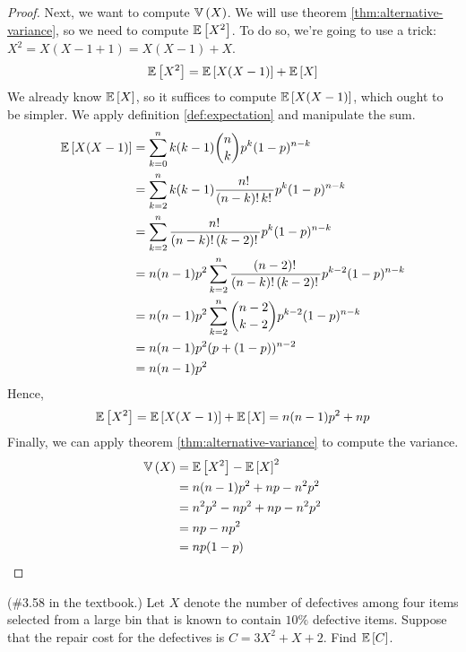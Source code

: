 \documentclass[11pt]{article}
\begin{document}
\begin{proof}
    Next, we want to compute $\operatorname{\mathbb{V}}{\left(X\right)}$.
    We will use theorem \ref{thm:alternative-variance}, so we need to compute
    $\operatorname{\mathbb{E}}{\left[X^2\right]}$.
    To do so, we're going to use a trick: $X^2 = X(X - 1 + 1) = X(X-1) + X$.
    \begin{equation*}
        \operatorname{\mathbb{E}}{\left[X^2\right]} = \operatorname{\mathbb{E}}{\left[X(X-1)\right]} + \operatorname{\mathbb{E}}{\left[X\right]}
    \end{equation*}
    We already know $\operatorname{\mathbb{E}}{\left[X\right]}$, so it suffices to compute $\operatorname{\mathbb{E}}{\left[X(X-1)\right]}$, which
    ought to be simpler. We apply definition \ref{def:expectation} and
    manipulate the sum.
    \begin{align*}
        \operatorname{\mathbb{E}}{\left[X(X-1)\right]}
        &= \sum_{k=0}^n {
            k(k-1) \binom{n}{k} p^k (1-p)^{n-k}
        } \\
        &= \sum_{k=2}^n {
            k(k-1)
            \frac{n!\,}{(n-k)!\, k!\,}
            p^k (1-p)^{n-k}
        } \\
        &= \sum_{k=2}^n {
            \frac{n!\,}{(n-k)!\, (k-2)!\,}
            p^k (1-p)^{n-k}
        } \\
        &= n(n-1) p^2 \sum_{k=2}^n {
            \frac{(n-2)!\,}{(n-k)!\, (k-2)!\,}
            p^{k-2}
            (1-p)^{n-k}
        } \\
        &= n(n-1) p^2 \sum_{k=2}^n {
            \binom{n-2}{k-2} p^{k-2} (1-p)^{n-k}
        } \\
        &= n(n-1) p^2 (p + (1-p))^{n-2} \\
        &= n(n-1) p^2
    \end{align*}
    Hence,
    \begin{equation}
        \label{eq:bin-xx1}
        \operatorname{\mathbb{E}}{\left[X^2\right]} = \operatorname{\mathbb{E}}{\left[X(X-1)\right]} + \operatorname{\mathbb{E}}{\left[X\right]} = n(n-1) p^2 + np
    \end{equation}
    Finally, we can apply theorem \ref{thm:alternative-variance} to compute the
    variance.
    \begin{align*}
        \label{eq:variance-binomial}
        \operatorname{\mathbb{V}}{\left(X\right)}
        &= \operatorname{\mathbb{E}}{\left[X^2\right]} - \operatorname{\mathbb{E}}{\left[X\right]}^2 \\
        &= n(n-1) p^2 + np - n^2 p^2 \\
        &= n^2 p^2 - n p^2 + np - n^2 p^2 \\
        &= np - np^2 \\
        &= np(1-p)
    \end{align*}
\end{proof}

\begin{eg}{(\#3.58 in the textbook.)}
    Let $X$ denote the number of defectives among four items selected from a
    large bin that is known to contain $10\%$ defective items.
    Suppose that the repair cost for the defectives is $C = 3X^2 + X + 2$.
    Find $\operatorname{\mathbb{E}}{\left[C\right]}$.
\end{eg}
\end{document}
